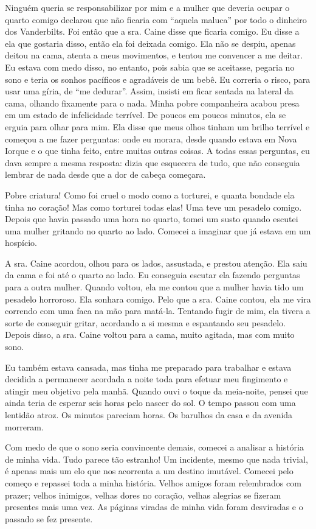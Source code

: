 Ninguém queria se responsabilizar por mim e a mulher que deveria ocupar
o quarto comigo declarou que não ficaria com ``aquela maluca'' por todo
o dinheiro dos Vanderbilts. Foi então que a sra. Caine disse que ficaria
comigo. Eu disse a ela que gostaria disso, então ela foi deixada comigo.
Ela não se despiu, apenas deitou na cama, atenta a meus movimentos, e
tentou me convencer a me deitar. Eu estava com medo disso, no entanto,
pois sabia que se aceitasse, pegaria no sono e teria os sonhos pacíficos
e agradáveis de um bebê. Eu correria o risco, para usar uma gíria, de
``me dedurar''. Assim, insisti em ficar sentada na lateral da cama,
olhando fixamente para o nada. Minha pobre companheira acabou presa em
um estado de infelicidade terrível. De poucos em poucos minutos, ela se
erguia para olhar para mim. Ela disse que meus olhos tinham um brilho
terrível e começou a me fazer perguntas: onde eu morara, desde quando
estava em Nova Iorque e o que tinha feito, entre muitas outras coisas. A
todas essas perguntas, eu dava sempre a mesma resposta: dizia que
esquecera de tudo, que não conseguia lembrar de nada desde que a dor de
cabeça começara.

Pobre criatura! Como foi cruel o modo como a torturei, e quanta bondade
ela tinha no coração! Mas como torturei todas elas! Uma teve um pesadelo
comigo. Depois que havia passado uma hora no quarto, tomei um susto
quando escutei uma mulher gritando no quarto ao lado. Comecei a imaginar
que já estava em um hospício.

A sra. Caine acordou, olhou para os lados, assustada, e prestou atenção.
Ela saiu da cama e foi até o quarto ao lado. Eu conseguia escutar ela
fazendo perguntas para a outra mulher. Quando voltou, ela me contou que
a mulher havia tido um pesadelo horroroso. Ela sonhara comigo. Pelo que
a sra. Caine contou, ela me vira correndo com uma faca na mão para
matá-la. Tentando fugir de mim, ela tivera a sorte de conseguir gritar,
acordando a si mesma e espantando seu pesadelo. Depois disso, a sra.
Caine voltou para a cama, muito agitada, mas com muito sono.

Eu também estava cansada, mas tinha me preparado para trabalhar e estava
decidida a permanecer acordada a noite toda para efetuar meu fingimento
e atingir meu objetivo pela manhã. Quando ouvi o toque da meia-noite,
pensei que ainda teria de esperar seis horas pelo nascer do sol. O tempo
passou com uma lentidão atroz. Os minutos pareciam horas. Os barulhos da
casa e da avenida morreram.

Com medo de que o sono seria convincente demais, comecei a analisar a
história de minha vida. Tudo parece tão estranho! Um incidente, mesmo
que nada trivial, é apenas mais um elo que nos acorrenta a um destino
imutável. Comecei pelo começo e repassei toda a minha história. Velhos
amigos foram relembrados com prazer; velhos inimigos, velhas dores no
coração, velhas alegrias se fizeram presentes mais uma vez. As páginas
viradas de minha vida foram desviradas e o passado se fez presente.

